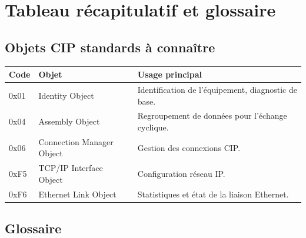 \section{Tableau récapitulatif et glossaire}
\label{sec:glossaire}

\subsection{Objets CIP standards à connaître}

\begin{center}
    \begin{tabular}{|p{2.3cm}|p{5cm}|p{7cm}|}
        \hline
        \textbf{Code} & \textbf{Objet} & \textbf{Usage principal} \\
        \hline
        0x01 & Identity Object & Identification de l'équipement, diagnostic de base. \\
        \hline
        0x04 & Assembly Object & Regroupement de données pour l'échange cyclique. \\
        \hline
        0x06 & Connection Manager Object & Gestion des connexions CIP. \\
        \hline
        0xF5 & TCP/IP Interface Object & Configuration réseau IP. \\
        \hline
        0xF6 & Ethernet Link Object & Statistiques et état de la liaison Ethernet. \\
        \hline
    \end{tabular}
\end{center}

\subsection{Glossaire}


